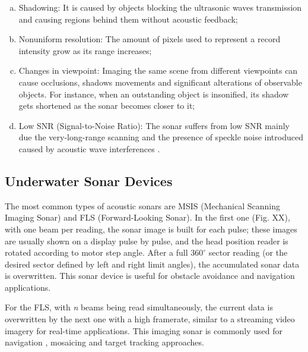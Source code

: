 \documentclass[final,5p,times]{elsarticle}
\begin{document}
\begin{enumerate}[(a)]
    \item Shadowing: It is caused by objects blocking the ultrasonic waves transmission and causing regions behind them without acoustic feedback;
    \item Nonuniform resolution: The amount of pixels used to represent a record intensity grow as its range increases;
    \item Changes in viewpoint: Imaging the same scene from different viewpoints can cause occlusions, shadows movements and significant alterations of observable objects. For instance, when an outstanding object is insonified, its shadow gets shortened as the sonar becomes closer to it;
    \item Low SNR (Signal-to-Noise Ratio): The sonar suffers from low SNR mainly due the very-long-range scanning and the presence of speckle noise introduced caused by acoustic wave interferences \cite{abbott1973}.
\end{enumerate}

\subsection{Underwater Sonar Devices}

The most common types of acoustic sonars are MSIS (Mechanical Scanning Imaging Sonar) and FLS (Forward-Looking Sonar). In the first one (Fig. XX), with one beam per reading, the sonar image is built for each pulse; these images are usually shown on a display pulse by pulse, and the head position reader is rotated according to motor step angle. After a full $360^{\circ}$ sector reading (or the desired sector defined by left and right limit angles), the accumulated sonar data is overwritten. This sonar device is useful for obstacle avoidance \cite{ganesan2015} and navigation \cite{ribas2010} applications.

For the FLS, with \textit{n} beams being read simultaneously, the current data is overwritten by the next one with a high framerate, similar to a streaming video imagery for real-time applications. This imaging sonar is commonly used for navigation \cite{fallon2013}, mosaicing \cite{hurtos2014a} and target tracking \cite{liu2016} approaches.

\end{document}
